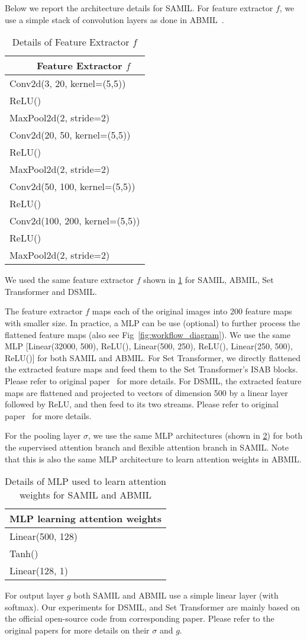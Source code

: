 Below we report the architecture details for SAMIL. For feature extractor $f$, we use a simple stack of convolution layers as done in ABMIL~\citep{ilse2018attention}.
\begin{table}[!h] 
\centering 
\begin{tabular}{l}
~~~~~Feature Extractor $f$ \\
\midrule
Conv2d(3, 20, kernel=(5,5))\\
ReLU()\\
MaxPool2d(2, stride=2)\\
Conv2d(20, 50, kernel=(5,5))\\
ReLU()\\
MaxPool2d(2, stride=2)\\
Conv2d(50, 100, kernel=(5,5))\\
ReLU()\\
Conv2d(100, 200, kernel=(5,5))\\
ReLU()\\
MaxPool2d(2, stride=2)\\

\bottomrule
\end{tabular}
\caption{Details of Feature Extractor $f$}
\label{tab:Feature Extractor $f$}
\end{table} 
We used the same feature extractor $f$ shown in \ref{tab:Feature Extractor $f$} for SAMIL, ABMIL, Set Transformer and DSMIL.

The feature extractor $f$ maps each of the original images into 200 feature maps with smaller size. In practice, a MLP can be use (optional) to further process the flattened feature maps (also see Fig~\ref{fig:workflow_diagram}). We use the same MLP [Linear(32000, 500), ReLU(), Linear(500, 250), ReLU(), Linear(250, 500), ReLU()] for both SAMIL and ABMIL. For Set Transformer, we directly flattened the extracted feature maps and feed them to the Set Transformer's ISAB blocks. Please refer to original paper~\citep{lee2019set} for more details. For DSMIL, the extracted feature maps are flattened and projected to vectors of dimension 500 by a linear layer followed by ReLU, and then feed to its two streams. Please refer to original paper~\citep{li2021dual} for more details.

For the pooling layer $\sigma$, we use the same MLP architectures (shown in \ref{tab:attention_MLP}) for both the supervised attention branch and flexible attention branch in SAMIL. Note that this is also the same MLP architecture to learn attention weights in ABMIL.

\begin{table}[!h] 
\centering 
\begin{tabular}{l}
MLP learning attention weights \\
\midrule
Linear(500, 128)\\
Tanh()\\
Linear(128, 1)\\

\bottomrule
\end{tabular}
\caption{Details of MLP used to learn attention weights for SAMIL and ABMIL}
\label{tab:attention_MLP}
\end{table} 

For output layer $g$ both SAMIL and ABMIL use a simple linear layer (with softmax). Our experiments for DSMIL,  and Set Transformer are mainly based on the official open-source code from corresponding paper. Please refer to the original papers for more details on their $\sigma$ and $g$.


